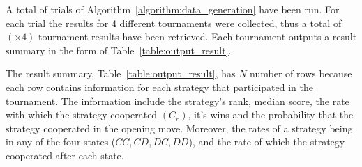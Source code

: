 \documentclass{article}
\newcommand{\uniquenumberofseeds}{}
\newcommand{\numberofalltournaments}{}
\begin{document}
A total of \uniquenumberofseeds trials of Algorithm~\ref{algorithm:data_generation} have been
run. For each trial the results for 4 different tournaments were collected,
thus a total of \numberofalltournaments $(\uniquenumberofseeds \times 4)$ tournament results have been
retrieved. Each tournament outputs a result summary in the form of
Table~\ref{table:output_result}.

The result summary, Table~\ref{table:output_result}, has \(N\) number of rows
because each row contains information for each strategy that participated in the
tournament. The information include the strategy's rank, median score, the rate
with which the strategy cooperated $(C_r)$, it's wins and the probability that
the strategy cooperated in the opening move. Moreover, the rates of a strategy
being in any of the four states ($CC, CD, DC, DD$), and the rate of which the
strategy cooperated after each state.

\begin{table}[h!]
    \begin{center}
\end{center}
\caption{Output result of a signle tournament.}\label{table:output_result}
\end{table}
\end{document}
